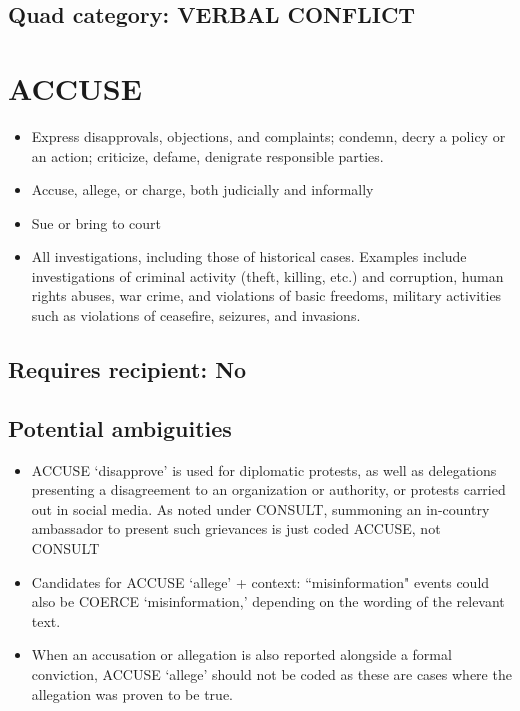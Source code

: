 \documentclass[11pt]{report}
\newcommand{\plcat}[1]{\textsf{#1}}
\begin{document}
\subsection{Quad category: VERBAL CONFLICT}

\newpage


\section{ACCUSE}

\begin{itemize}
	\item Express disapprovals, objections, and complaints; condemn, decry a policy or an action; criticize, defame, denigrate responsible parties.
	\item Accuse, allege, or charge, both judicially and informally
	\item Sue or bring to court
	\item All investigations, including those of historical cases. Examples include investigations of  criminal activity (theft, killing, etc.) and corruption, human rights abuses, war crime, and violations of basic freedoms, military activities such as violations of ceasefire, seizures, and invasions.
\end{itemize}


\subsection{Requires recipient: No}

\subsection{Potential ambiguities}

\begin{itemize}

\item \plcat{ACCUSE} `disapprove' is used for diplomatic protests, as well as delegations presenting a disagreement to an organization or authority, or protests carried out in social media. As noted under \plcat{CONSULT}, summoning an in-country ambassador to present such grievances is just coded  \plcat{ACCUSE}, not  \plcat{CONSULT}

\item Candidates for \plcat{ACCUSE} `allege' + context: ``misinformation" events could also be \plcat{COERCE} `misinformation,' depending on the wording of the relevant text.

\item When an accusation or allegation is also reported alongside a formal conviction, \plcat{ACCUSE} `allege' should not be coded as these are cases where the allegation was proven to be true.

\end{itemize}
\end{document}
